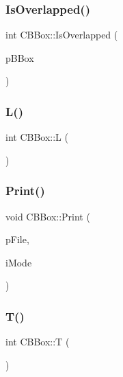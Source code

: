 \subsubsection{\texorpdfstring{IsOverlapped()}{IsOverlapped()}\hspace{0.1cm}{\footnotesize\ttfamily [2/2]}}
{\footnotesize\ttfamily int C\+B\+Box\+::\+Is\+Overlapped (\begin{DoxyParamCaption}\item[{\mbox{\hyperlink{classCBBox}{C\+B\+Box}} $\ast$}]{p\+B\+Box }\end{DoxyParamCaption})}

\mbox{\label{classCBBox_a8dbcaa755e35418d1c90b1ab3748c0d8}} 
\subsubsection{\texorpdfstring{L()}{L()}}
{\footnotesize\ttfamily int C\+B\+Box\+::L (\begin{DoxyParamCaption}{ }\end{DoxyParamCaption})\hspace{0.3cm}{\ttfamily [inline]}}

\mbox{\label{classCBBox_a596b6427a7047a1827b0dfd2ab767ec3}} 
\subsubsection{\texorpdfstring{Print()}{Print()}}
{\footnotesize\ttfamily void C\+B\+Box\+::\+Print (\begin{DoxyParamCaption}\item[{F\+I\+LE $\ast$}]{p\+File,  }\item[{int}]{i\+Mode }\end{DoxyParamCaption})}

\mbox{\label{classCBBox_a4f032d03aa68e110aa31217cd687c417}} 
\subsubsection{\texorpdfstring{T()}{T()}}
{\footnotesize\ttfamily int C\+B\+Box\+::T (\begin{DoxyParamCaption}{ }\end{DoxyParamCaption})\hspace{0.3cm}{\ttfamily [inline]}}

